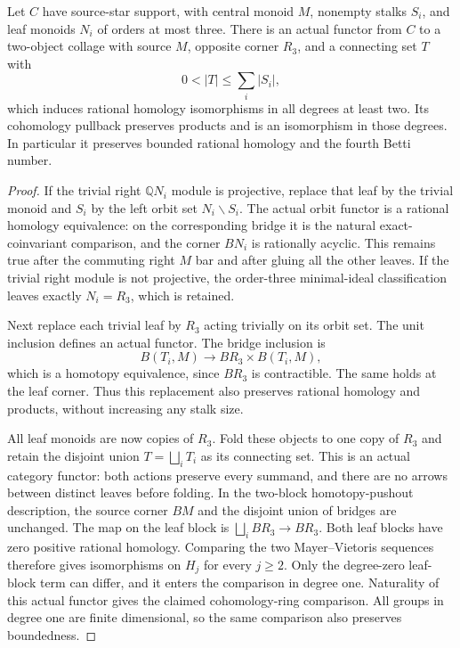 \begin{proposition}
\label{CP2:A-small-leaf-right-zero-merge}
Let $C$ have source-star support, with central monoid $M$, nonempty
stalks $S_i$, and leaf monoids $N_i$ of orders at most three.
There is an actual functor from $C$ to a two-object collage with
source $M$, opposite corner $R_3$, and a connecting set $T$ with
\[
             0<|T|\leq\sum_i |S_i|,
\]
which induces rational homology isomorphisms in all degrees at
least two.  Its cohomology pullback preserves products and is an
isomorphism in those degrees.  In particular it preserves bounded
rational homology and the fourth Betti number.
\end{proposition}
\begin{proof}
If the trivial right $\mathbb QN_i$ module is projective, replace
that leaf by the trivial monoid and $S_i$ by the left orbit set
$N_i\backslash S_i$.  The actual orbit functor is a rational
homology equivalence: on the corresponding bridge it is the
natural exact-coinvariant comparison, and the corner $BN_i$ is
rationally acyclic.  This remains true after the commuting right
$M$ bar and after gluing all the other leaves.  If the trivial
right module is not projective, the order-three minimal-ideal
classification leaves exactly $N_i=R_3$, which is retained.

Next replace each trivial leaf by $R_3$ acting trivially on its
orbit set.  The unit inclusion defines an actual functor.
The bridge inclusion is
\[
 B(T_i,M)\longrightarrow BR_3\times B(T_i,M),
\]
which is a homotopy equivalence, since $BR_3$ is contractible.
The same holds at the leaf corner.  Thus this replacement also
preserves rational homology and products, without increasing any
stalk size.

All leaf monoids are now copies of $R_3$.  Fold these objects to
one copy of $R_3$ and retain the disjoint union $T=\bigsqcup_i T_i$
as its connecting set.  This is an actual category functor: both
actions preserve every summand, and there are no arrows between
distinct leaves before folding.  In the two-block homotopy-pushout
description, the source corner $BM$ and the disjoint union of
bridges are unchanged.  The map on the leaf block is
\(\bigsqcup_i BR_3\to BR_3\).  Both leaf blocks have zero
positive rational homology.  Comparing the two Mayer--Vietoris
sequences therefore gives isomorphisms on $H_j$ for every
$j\geq2$.  Only the degree-zero leaf-block term can differ,
and it enters the comparison in degree one.  Naturality of this
actual functor gives the claimed cohomology-ring comparison.
All groups in degree one are finite dimensional, so the same
comparison also preserves boundedness.
\end{proof}

